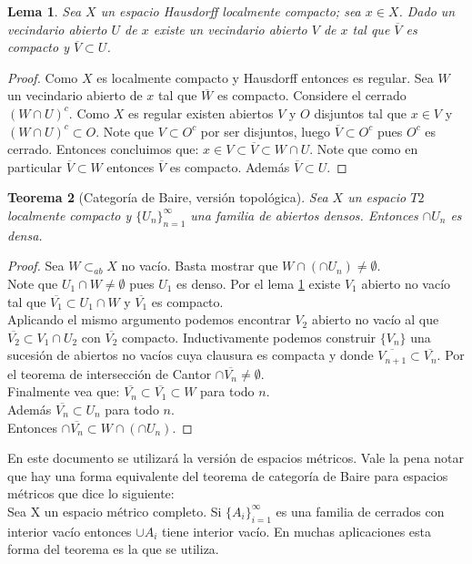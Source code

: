 \documentclass{article}
\newtheorem{theorem}{Teorema}[section]
\newtheorem{lemma}[theorem]{Lema}
\theoremstyle{definition}
\newcommand{\suc}[4][\infty]{\{{#2_#3}\}_{#3=#4}^#1}
\begin{document}
\begin{lemma} \label{lemaBaire}
Sea $X$ un espacio Hausdorff localmente compacto; sea $x\in X$. Dado un vecindario abierto $U$ de $x$ existe un vecindario abierto $V$ de $x$ tal que $\overline{V}$ es compacto y $\overline{V} \subset U$.
\end{lemma}
\begin{proof}
Como $X$ es localmente compacto y Hausdorff entonces es regular. Sea $W$ un vecindario abierto de $x$ tal que $\overline{W}$ es compacto. Considere el cerrado $(W\cap U)^c$. Como $X$ es regular existen abiertos $V$ y $O$ disjuntos tal que $x\in V$ y $(W\cap U)^c\subset O$. Note que $V\subset O^c$ por ser disjuntos, luego $\overline{V}\subset O^c$ pues $O^c$ es cerrado. Entonces concluimos que: $x\in V\subset \overline{V}\subset W\cap U$. Note que como en particular $\overline{V}\subset W$ entonces $\overline{V}$ es compacto. Además $\overline{V}\subset U$.
\end{proof}
\begin{theorem}[Categoría de Baire, versión topológica]
Sea $X$ un espacio $T2$ localmente compacto y $\{U_n\}_{n=1}^\infty$ una familia de abiertos densos. Entonces $\cap U_n$ es densa.
\end{theorem}
\begin{proof} 
Sea $W\subset_{ab} X$ no vacío. Basta mostrar que $W\cap(\cap U_n)\neq \emptyset$.\\
Note que $U_1\cap W \neq \emptyset$ pues $U_1$ es denso. Por el lema \ref{lemaBaire} existe $V_1$ abierto no vacío tal que $\overline{V_1}\subset U_1\cap W$
y $\overline{V_1}$ es compacto.\\
Aplicando el mismo argumento podemos encontrar $V_2$ abierto no vacío al que $\overline{V_2}\subset V_1\cap U_2$ con $\overline{V_2}$ compacto. Inductivamente podemos construir $\{V_n\}$ una sucesión de abiertos no vacíos cuya clausura es compacta y donde $\overline{V_{n+1}}\subset \overline{V_{n}}$. Por el teorema de intersección de Cantor $\cap \overline{V_n}\neq \emptyset$.\\
Finalmente vea que:
$\overline{V_n}\subset \overline{V_1}\subset W$ para todo $n$.\\
Además $\overline{V_n}\subset U_n$ para todo $n$.\\
Entonces $\cap \overline{V_n} \subset W\cap (\cap U_n)$.
\end{proof}
En este documento se utilizará la versión de espacios métricos. Vale la pena notar que hay una forma equivalente del teorema de categoría de Baire para espacios métricos que dice lo siguiente:\\
Sea X un espacio métrico completo. Si $\suc{A}{i}{1}$ es una familia de cerrados con interior vacío entonces $\cup A_i$ tiene interior vacío. En muchas aplicaciones esta forma del teorema es la que se utiliza. 
\end{document}
